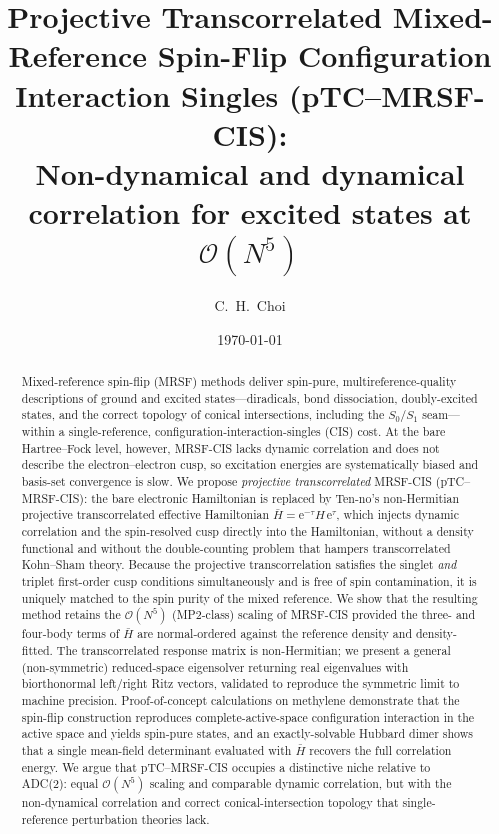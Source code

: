 \documentclass[aps,prb,reprint,superscriptaddress,floatfix]{revtex4-2}
\newcommand{\Hbar}{\bar{H}}
\newcommand{\ee}{\mathrm{e}}
\begin{document}
\title{Projective Transcorrelated Mixed-Reference Spin-Flip
Configuration Interaction Singles (pTC--MRSF-CIS):\\
Non-dynamical and dynamical correlation for excited states at
$\mathcal{O}(N^5)$}

\author{C.~H.~Choi}

\date{\today}

\begin{abstract}
Mixed-reference spin-flip (MRSF) methods deliver spin-pure, multireference-quality
descriptions of ground and excited states---diradicals, bond dissociation,
doubly-excited states, and the correct topology of conical intersections,
including the $S_0/S_1$ seam---within a single-reference, configuration-interaction-singles
(CIS) cost. At the bare Hartree--Fock level, however, MRSF-CIS lacks dynamic
correlation and does not describe the electron--electron cusp, so excitation
energies are systematically biased and basis-set convergence is slow. We propose
\emph{projective transcorrelated} MRSF-CIS (pTC--MRSF-CIS): the bare electronic
Hamiltonian is replaced by Ten-no's non-Hermitian projective transcorrelated
effective Hamiltonian $\Hbar=\ee^{-\tau}H\,\ee^{\tau}$, which injects dynamic
correlation and the spin-resolved cusp directly into the Hamiltonian, without a
density functional and without the double-counting problem that hampers
transcorrelated Kohn--Sham theory. Because the projective transcorrelation
satisfies the singlet \emph{and} triplet first-order cusp conditions
simultaneously and is free of spin contamination, it is uniquely matched to the
spin purity of the mixed reference. We show that the resulting method retains the
$\mathcal{O}(N^5)$ (MP2-class) scaling of MRSF-CIS provided the three- and
four-body terms of $\Hbar$ are normal-ordered against the reference density and
density-fitted. The transcorrelated response matrix is non-Hermitian; we present
a general (non-symmetric) reduced-space eigensolver returning real eigenvalues
with biorthonormal left/right Ritz vectors, validated to reproduce the symmetric
limit to machine precision. Proof-of-concept calculations on methylene
demonstrate that the spin-flip construction reproduces complete-active-space
configuration interaction in the active space and yields spin-pure states, and an
exactly-solvable Hubbard dimer shows that a single mean-field determinant
evaluated with $\Hbar$ recovers the full correlation energy. We argue that
pTC--MRSF-CIS occupies a distinctive niche relative to ADC(2): equal
$\mathcal{O}(N^5)$ scaling and comparable dynamic correlation, but with the
non-dynamical correlation and correct conical-intersection topology that
single-reference perturbation theories lack.
\end{abstract}
\end{document}
